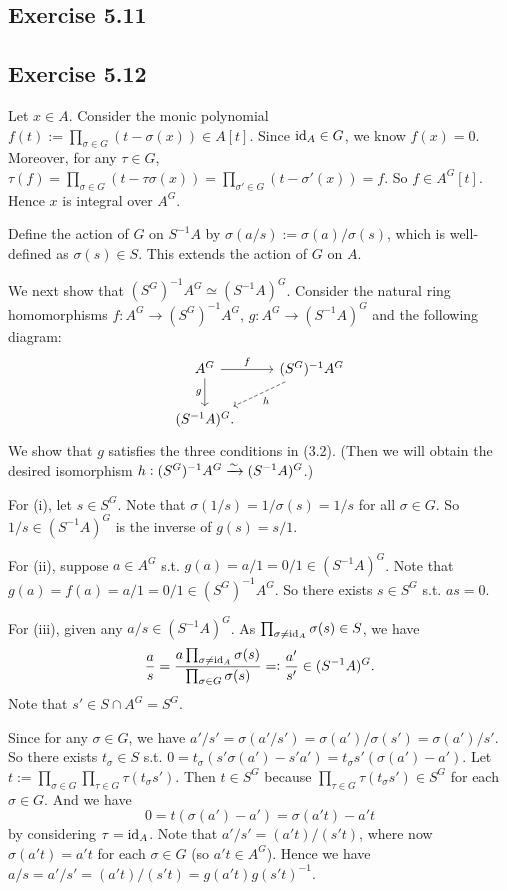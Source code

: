 \documentclass[../A&M.tex]{subfiles}
\begin{document}
\subsection*{Exercise 5.11}

\subsection*{Exercise 5.12}

Let $x\in A$. Consider the monic polynomial $f(t):= \prod_{\sigma \in G} (t - \sigma(x)) \in A[t]$. Since $\operatorname{id}_A \in G$, we know $f(x)=0$. Moreover, for any $\tau\in G$, $\tau(f) = \prod_{\sigma \in G} (t - \tau\sigma(x)) = \prod_{\sigma' \in G} (t - \sigma'(x)) = f$. So $f\in A^G[t]$. Hence $x$ is integral over $A^G$.

Define the action of $G$ on $S^{-1}A$ by $\sigma(a/s) := \sigma(a)/\sigma(s)$, which is well-defined as $\sigma(s) \in S$. This extends the action of $G$ on $A$.

We next show that $(S^G)^{-1}A^G \simeq (S^{-1}A)^G$. Consider the natural ring homomorphisms $f:A^G \to (S^G)^{-1}A^G$, $g:A^G \to (S^{-1}A)^G$ and the following diagram:
$$
\begin{tikzcd}
  A^G \arrow[r, "f"] \arrow[d, "g"'] & (S^G)^{-1}A^G \arrow[dl, dashrightarrow, "h"]   \\
 (S^{-1}A)^G.
\end{tikzcd}
$$
We show that $g$ satisfies the three conditions in (3.2). (Then we will obtain the desired isomorphism $h: (S^G)^{-1}A^G  \xrightarrow{\sim} (S^{-1}A)^G$.)

For (i), let $s \in S^G$. Note that $\sigma(1/s) = 1/\sigma(s) = 1/s$ for all $\sigma\in G$. So $1/s \in (S^{-1}A)^G$ is the inverse of $g(s) = s/1$.

For (ii), suppose $a\in A^G$ s.t. $g(a) = a/1 = 0/1 \in (S^{-1}A)^G$. Note that $g(a) = f(a) = a/1 = 0/1 \in (S^G)^{-1}A^G$. So there exists $s \in S^G$ s.t. $as = 0$.

For (iii), given any $a/s \in (S^{-1}A)^G$. As $\prod_{\sigma \neq \operatorname{id}_A} \sigma(s) \in S$, we have
$$
\frac{a}{s}
= \frac{a \prod_{\sigma \neq \operatorname{id}_A} \sigma(s)}{\prod_{\sigma \in G} \sigma(s)}
=: \frac{a'}{s'} \in (S^{-1}A)^G.
$$
Note that $s' \in S \cap A^G = S^G$.

Since for any $\sigma\in G$, we have $a'/s' = \sigma(a'/s') = \sigma(a')/\sigma(s') = \sigma(a')/s'$. So there exists $t_\sigma \in S$ s.t. $0 = t_\sigma(s'\sigma(a') - s'a') =t_\sigma s' (\sigma(a')-a')$. Let $t:=\prod_{\sigma \in G} \prod_{\tau \in G} \tau(t_\sigma s')$. Then $t \in S^G$ because $\prod_{\tau \in G} \tau(t_\sigma s') \in S^G$ for each $\sigma \in G$. And we have
$$
0 = t(\sigma(a')-a') = \sigma(a't) - a't
$$
by considering $\tau=\operatorname{id}_A$. Note that $a'/s' = (a't)/(s't)$, where now $\sigma(a't) = a't$ for each $\sigma \in G$ (so $a't \in A^G$). Hence we have $a/s = a'/s' = (a't)/(s't) = g(a't)g(s't)^{-1}$.
\end{document}
